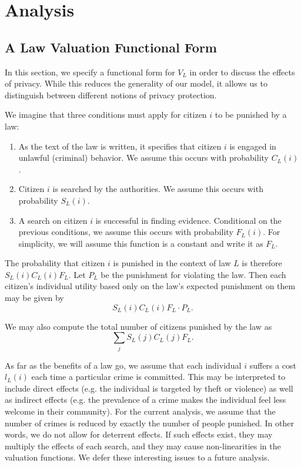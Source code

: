 
\section{Analysis}
\label{sec:analysis}



\subsection{A Law Valuation Functional Form}
In this section, we specify a functional form for $V_L$ in order to discuss the effects of privacy.  While this reduces the generality of our model, it allows us to distinguish between different notions of privacy protection.  

We imagine that three conditions must apply for citizen $i$ to be punished by a law:

\begin{enumerate}
\item As the text of the law is written, it specifies that citizen $i$ is engaged in unlawful (criminal) behavior.  We assume this occurs with probability $C_L(i)$.
\item Citizen $i$ is searched by the authorities.  We assume this occurs with probability $S_L(i)$.
\item A search on citizen $i$ is successful in finding evidence.  Conditional on the previous conditions, we assume this occurs with probability $F_L(i)$.  For simplicity, we will assume this function is a constant and write it as $F_L$.
\end{enumerate}

The probability that citizen $i$ is punished in the context of law $L$ is therefore $S_L(i)C_L(i)F_L$. 
Let $P_L$ be the punishment for violating the law. Then each citizen's individual utility based only on the law's expected punishment on them may be given by 
$$S_L(i)C_L(i)F_L\cdot P_L.$$

We may also compute the total number of citizens punished by the law as $$\sum_j S_L(j)C_L(j)F_L.$$  

As far as the benefits of a law go, we assume that each individual $i$ suffers a cost $l_L(i)$ each time a particular crime is committed.  This may be interpreted to include direct effects (e.g. the individual is targeted by theft or violence) as well as indirect effects (e.g. the prevalence of a crime makes the individual feel less welcome in their community).  For the current analysis, we assume that the number of crimes is reduced by exactly the number of people punished.  In other words, we do not allow for deterrent effects.  If such effects exist, they may multiply the effects of each search, and they may cause non-linearities in the valuation functions.  We defer these interesting issues to a future analysis.

